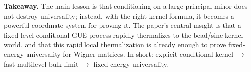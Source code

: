 \documentclass[11pt]{article}
\begin{document}
\textbf{Takeaway.} The main lesson is that conditioning on a large principal minor does not destroy universality; instead, with the right kernel formula, it becomes a powerful coordinate system for proving it. The paper's central insight is that a fixed-level conditional GUE process rapidly thermalizes to the bead/sine-kernel world, and that this rapid local thermalization is already enough to prove fixed-energy universality for Wigner matrices. In short: explicit conditional kernel $\rightarrow$ fast multilevel bulk limit $\rightarrow$ fixed-energy universality.
\end{document}
